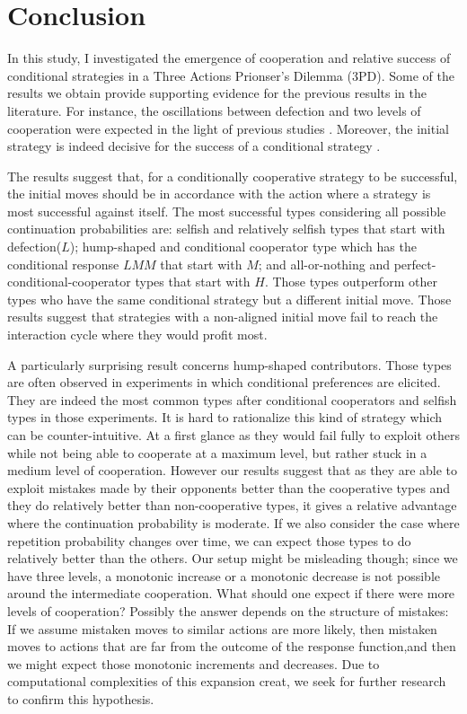 \documentclass[12pt]{article}
\begin{document}
\section{Conclusion}
 
In this study, I investigated the emergence of cooperation and relative success of conditional strategies in a Three Actions Prionser's Dilemma (3PD). Some of the results we obtain provide supporting evidence for the previous results in the literature. For instance, the oscillations between defection and two levels of cooperation were expected in the light of previous studies \citep{Wahl1999-nn, Nowak1989-vx, Bendor1995-zf, Imhof2005-ti, Van_Veelen2012-xf, Garcia2016-tr, Van_Veelen2012-xf}. Moreover, the initial strategy is indeed decisive for the success of a conditional strategy \citep{Wahl1999-zi, Wahl1999-nn}. 

The results suggest that, for a conditionally cooperative strategy to be successful, the initial moves should be in accordance with the action where a strategy is most successful against itself. The most successful types considering all possible continuation probabilities are: selfish and relatively selfish types that start with defection($L$); hump-shaped and conditional cooperator type which has the conditional response $LMM$ that start with $M$; and all-or-nothing and perfect-conditional-cooperator types that start with $H$. Those types outperform other types who have the same conditional strategy but a different initial move. Those results suggest that strategies with a non-aligned initial move fail to reach the interaction cycle where they would profit most. 

A particularly surprising result concerns hump-shaped contributors. Those types are often observed in experiments in which conditional preferences are elicited. They are indeed the most common types after conditional cooperators and selfish types in those experiments. It is hard to rationalize this kind of strategy which can be counter-intuitive. At a first glance as they would fail fully to exploit others while not being able to cooperate at a maximum level,  but rather stuck in a medium level of cooperation. However our results suggest that as they are able to exploit mistakes made by their opponents better than the cooperative types and they do relatively better than non-cooperative types, it gives a relative advantage where the continuation probability is moderate. If we also consider the case where repetition probability changes over time, we can expect those types to do relatively better than the others. Our setup might be misleading though; since we have three levels, a monotonic increase or a monotonic decrease is not possible around the intermediate cooperation. What should one expect if there were more levels of cooperation? Possibly the answer depends on the structure of mistakes: If we assume mistaken moves to similar actions are more likely, then mistaken moves to actions that are far from the outcome of the response function,and then we might expect those monotonic increments and decreases. Due to computational complexities of this expansion creat, we seek for further research to confirm this hypothesis. 
\end{document}
